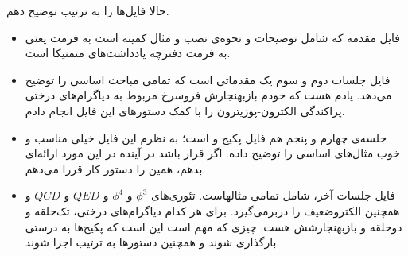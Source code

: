 \documentclass[a4paper, 12pt]{article}
\begin{document}
حالا فایل‌ها را به ترتیب توضیح دهم.
\begin{itemize}
	\item 
	فایل مقدمه که شامل توضیحات و نحوه‌ی نصب و مثال کمینه است به فرمت 
	یعنی به فرمت دفترچه یادداشت‌های متمتیکا است.
	\item 
	فایل جلسات دوم و سوم یک 
	مقدماتی است که تمامی مباحث اساسی 
	را توضیح می‌دهد. یادم هست که خودم بازبهنجارش فروسرخ مربوط به دیاگرام‌های درختی پراکندگی الکترون-پوزیترون را با کمک دستورهای این فایل  انجام دادم.
	
	\item جلسه‌ی چهارم و پنجم هم فایل 
	پکیج
	و
	است؛ به نظرم این فایل خیلی مناسب و خوب مثال‌های اساسی را توضیح داده. اگر قرار باشد در آینده در این مورد ارائه‌ای بدهم، همین را دستور کار قررا می‌دهم.
	\item 
	فایل جلسات آخر، شامل تمامی مثالهاست. تئوری‌های 
	$\phi^3$
	و
	$\phi^4$
	و $QED$ و $QCD$ و همچنین الکتروضعیف را دربرمی‌گیرد. برای هر کدام دیاگرام‌های درختی، تک‌حلقه و دوحلقه و بازبهنجارشش هست.
	چیزی که مهم است این است که پکیج‌ها به درستی بارگذاری شوند و همچنین دستورها به ترتیب اجرا شوند.
\end{itemize} 
\end{document}
